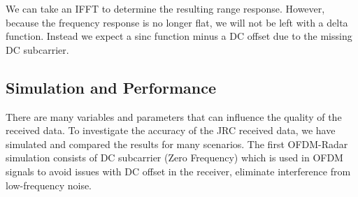 \documentclass[conference]{IEEEtran}
\begin{document}
		We can take an IFFT to determine the resulting range response. However, because the frequency response is no longer flat, we will not be left with a delta function. Instead we expect a sinc function minus a DC offset due to the missing DC subcarrier.
		
		
		

\subsection {Simulation and Performance}
      
There are many variables and parameters that can influence the quality of the received data. To investigate the accuracy of the JRC received data, we have simulated and compared the results for many scenarios. The first OFDM-Radar simulation consists of DC subcarrier (Zero Frequency) which is used in OFDM signals to avoid issues with DC offset in the receiver, eliminate interference from low-frequency noise. 
\end{document}
